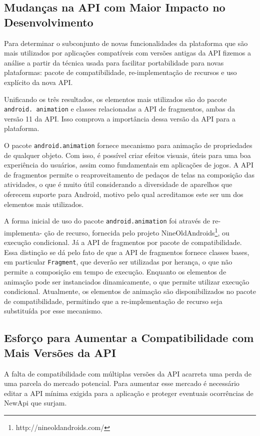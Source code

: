 \subsection{Mudanças na API com Maior Impacto no Desenvolvimento} \label{subsec:mudancas}

Para determinar o subconjunto de novas funcionalidades da plataforma que são mais
utilizados por aplicações compatíveis com versões antigas da API fizemos a análise
a partir da técnica usada para facilitar portabilidade para novas plataformas: pacote
de compatibilidade, re-implementação de recursos e uso explícito da nova API.

Unificando os três resultados,  os elementos mais utilizados são do pacote
\texttt{android. animation} e classes relacionadas a API de fragmentos, ambas
da versão 11 da API. Isso comprova a importância dessa versão da API para a
plataforma. 

O pacote \texttt{android.animation} fornece mecanismo para animação de propriedades
de qualquer objeto. Com isso, é possível criar efeitos visuais, úteis para uma boa
experiência do usuários, assim como fundamentais em aplicações de jogos. A API de
fragmentos permite o reaproveitamento de pedaços de telas na composição das atividades,
o que é muito útil considerando a diversidade de aparelhos que oferecem suporte para
Android, motivo pelo qual acreditamos este ser um dos elementos mais utilizados. 

A forma inicial de uso do pacote \texttt{android.animation} foi através de
re-implementa- ção de recurso, fornecida pelo projeto NineOldAndroids\footnote{http://nineoldandroids.com/},
ou execução condicional. Já a API de fragmentos por pacote de compatibilidade.
Essa distinção se dá pelo fato de que a API de fragmentos fornece classes bases,
em particular \texttt{Fragment}, que deverão ser utilizadas por herança, o que não
permite a composição em tempo de execução. Enquanto os elementos de animação pode
ser instanciados dinamicamente, o que permite utilizar execução condicional.
Atualmente, os elementos de animação são disponibilizados no pacote de compatibilidade,
permitindo que a re-implementação de recurso seja substituída por esse mecanismo.

\subsection{Esforço para Aumentar a Compatibilidade com Mais Versões da API} \label{subsec:esforco}

A falta de compatibilidade com múltiplas versões da API acarreta uma perda de uma
parcela do mercado potencial. Para aumentar esse mercado é necessário editar a API
mínima exigida para a aplicação e proteger eventuais ocorrências de NewApi que surjam.

